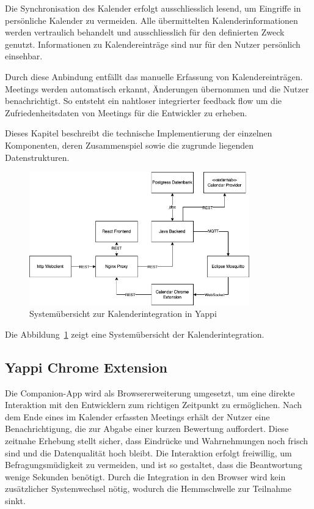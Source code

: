 \documentclass[12pt,a4paper]{report}
\begin{document}
        Die Synchronisation des Kalender erfolgt ausschliesslich lesend, um Eingriffe in persönliche Kalender zu vermeiden.
        Alle übermittelten Kalenderinformationen werden vertraulich behandelt und ausschliesslich für den definierten Zweck genutzt.
        Informationen zu Kalendereinträge sind nur für den Nutzer persönlich einsehbar.

        Durch diese Anbindung entfällt das manuelle Erfassung von Kalendereinträgen. Meetings werden automatisch erkannt,
        Änderungen übernommen und die Nutzer benachrichtigt. So entsteht ein nahtloser integrierter feedback flow um die
        Zufriedenheitsdaten von Meetings für die Entwickler zu erheben.

        Dieses Kapitel beschreibt die technische Implementierung der einzelnen Komponenten, deren Zusammenspiel
        sowie die zugrunde liegenden Datenstrukturen.


        \begin{figure}[!htbp]
          \centering
          \includegraphics[width=0.85\textwidth]{../figures/implementation-claendar-companion-system.drawio.png}
          \caption{Systemübersicht zur Kalenderintegration in Yappi}
          \label{fig:implementation-calendar-companion-system}
        \end{figure}

        Die Abbildung~\ref{fig:implementation-calendar-companion-system} zeigt eine Systemübersicht der Kalenderintegration.

  \subsection{Yappi Chrome Extension}
      Die Companion-App wird als Browsererweiterung umgesetzt, um eine direkte Interaktion mit den Entwicklern zum richtigen
      Zeitpunkt zu ermöglichen. Nach dem Ende eines im Kalender erfassten Meetings erhält der Nutzer eine Benachrichtigung,
      die zur Abgabe einer kurzen Bewertung auffordert. Diese zeitnahe Erhebung stellt sicher, dass Eindrücke und Wahrnehmungen
      noch frisch sind und die Datenqualität hoch bleibt. Die Interaktion erfolgt freiwillig, um Befragungsmüdigkeit zu vermeiden,
      und ist so gestaltet, dass die Beantwortung wenige Sekunden benötigt. Durch die Integration in den Browser wird kein
      zusätzlicher Systemwechsel nötig, wodurch die Hemmschwelle zur Teilnahme sinkt.
\end{document}
